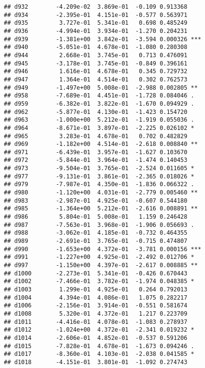 \documentclass[
]{article}
\begin{document}
\begin{verbatim}
## d932        -4.209e-02  3.869e-01  -0.109 0.913368    
## d934        -2.395e-01  4.151e-01  -0.577 0.563971    
## d935         3.727e-01  5.341e-01   0.698 0.485249    
## d936        -4.994e-01  3.934e-01  -1.270 0.204231    
## d939        -1.381e+00  3.842e-01  -3.594 0.000326 ***
## d940        -5.051e-01  4.678e-01  -1.080 0.280308    
## d944         2.668e-01  3.745e-01   0.713 0.476091    
## d945        -3.178e-01  3.745e-01  -0.849 0.396161    
## d946         1.616e-01  4.678e-01   0.345 0.729732    
## d947         1.364e-01  4.514e-01   0.302 0.762573    
## d949        -1.497e+00  5.008e-01  -2.988 0.002805 ** 
## d958        -7.689e-01  4.451e-01  -1.728 0.084046 .  
## d959        -6.382e-01  3.822e-01  -1.670 0.094929 .  
## d962        -5.877e-01  4.130e-01  -1.423 0.154720    
## d963        -1.000e+00  5.212e-01  -1.919 0.055036 .  
## d964        -8.671e-01  3.897e-01  -2.225 0.026102 *  
## d965         3.283e-01  4.678e-01   0.702 0.482829    
## d969        -1.182e+00  4.514e-01  -2.618 0.008840 ** 
## d971        -6.439e-01  3.957e-01  -1.627 0.103670    
## d972        -5.844e-01  3.964e-01  -1.474 0.140453    
## d973        -9.504e-01  3.765e-01  -2.524 0.011605 *  
## d977        -9.131e-01  3.861e-01  -2.365 0.018026 *  
## d979        -7.987e-01  4.350e-01  -1.836 0.066322 .  
## d980        -1.120e+00  4.031e-01  -2.779 0.005460 ** 
## d983        -2.987e-01  4.925e-01  -0.607 0.544180    
## d985        -1.364e+00  5.212e-01  -2.616 0.008891 ** 
## d986         5.804e-01  5.008e-01   1.159 0.246428    
## d987        -7.563e-01  3.968e-01  -1.906 0.056693 .  
## d988        -3.062e-01  4.185e-01  -0.732 0.464355    
## d989        -2.691e-01  3.765e-01  -0.715 0.474807    
## d990        -1.653e+00  4.372e-01  -3.781 0.000156 ***
## d991        -1.227e+00  4.925e-01  -2.492 0.012706 *  
## d997        -1.150e+00  4.397e-01  -2.617 0.008885 ** 
## d1000       -2.273e-01  5.341e-01  -0.426 0.670443    
## d1002       -7.466e-01  3.782e-01  -1.974 0.048385 *  
## d1003        1.299e-01  4.925e-01   0.264 0.792013    
## d1004        4.394e-01  4.086e-01   1.075 0.282217    
## d1006       -2.156e-01  3.914e-01  -0.551 0.581674    
## d1008        5.320e-01  4.372e-01   1.217 0.223709    
## d1011       -4.416e-01  4.078e-01  -1.083 0.278937    
## d1012       -1.024e+00  4.372e-01  -2.341 0.019232 *  
## d1014       -2.606e-01  4.852e-01  -0.537 0.591206    
## d1015       -7.828e-01  4.678e-01  -1.673 0.094246 .  
## d1017       -8.360e-01  4.103e-01  -2.038 0.041585 *  
## d1018       -4.151e-01  3.801e-01  -1.092 0.274743    

\end{verbatim}
\end{document}

